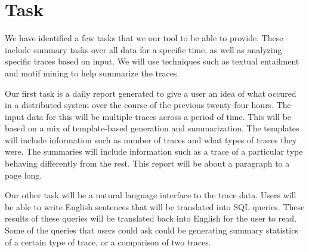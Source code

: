 \section{Task}

We have identified a few tasks that we our tool to be able to provide. These include summary tasks over all data for a specific time,
as well as analyzing specific traces based on input. We will use techniques such as textual entailment and motif mining to help summarize the traces. 

Our first task is a daily report generated to give a user an idea of what occured in a distributed system over the course 
of the previous twenty-four hours. The input data for this will be multiple traces across a period of time. This will be 
based on a mix of template-based generation and summarization. The templates will include information such as number of traces
and what types of traces they were. The summaries will include information such as a trace of a particular type behaving differently
from the rest. This report will be about a paragraph to a page long. 

Our other task will be a natural language interface to the trace data. Users will be able to write English sentences that will be
translated into SQL queries. These results of these queries will be translated back into English for the user to read. Some of the 
queries that users could ask could be generating summary statistics of a certain type of trace, or a comparison of two traces.
